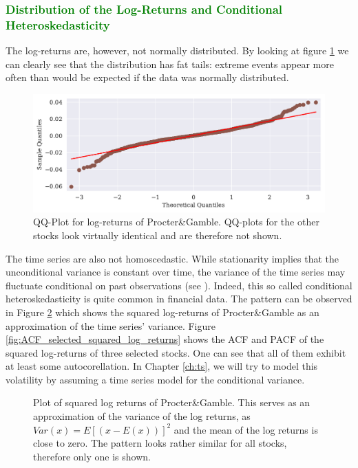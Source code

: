 \subsubsection{\textcolor{green}{Distribution of the Log-Returns and Conditional Heteroskedasticity}}
The log-returns are, however, not normally distributed. By looking at figure \ref{fig:PG_qq_fd_log_adjclose} we can clearly see that the distribution has fat tails: extreme events appear more often than would be expected if the data was normally distributed. 
\begin{figure}[h!]
    \centering
    \begin{adjustbox}{width=.9\textwidth,center}
    \includegraphics[]{figures/PG_log_adjclose_fd_and_qq.pdf}
    \end{adjustbox}  
    \caption{QQ-Plot for log-returns of Procter\&Gamble. QQ-plots for the other stocks look virtually identical and are therefore not shown.}
    \label{fig:PG_qq_fd_log_adjclose}
\end{figure}
The time series are also not homoscedastic. While stationarity implies that the unconditional variance is constant over time, the variance of the time series may fluctuate conditional on past observations (see \citep{engle_autoregressive_1982}). Indeed, this so called conditional heteroskedasticity is quite common in financial data. The pattern can be observed in Figure \ref{fig:PG_squared_log_returns} which shows the squared log-returns of Procter\&Gamble as an approximation of the time series' variance. Figure \ref{fig:ACF_selected_squared_log_returns} shows the ACF and PACF of the squared log-returns of three selected stocks. One can see that all of them exhibit at least some autocorellation. In Chapter \ref{ch:ts}, we will try to model this volatility by assuming a time series model for the conditional variance. 

\begin{figure}[h!]
    \centering
    \begin{adjustbox}{width=.95\textwidth,center}
    
    \end{adjustbox}  
    \caption{Plot of squared log returns of Procter\&Gamble. This serves as an approximation of the variance of the log returns, as $Var(x) = E [(x - E(x))]^2$ and the mean of the log returns is close to zero. The pattern looks rather similar for all stocks, therefore only one is shown.}
    \label{fig:PG_squared_log_returns}
\end{figure}{}

